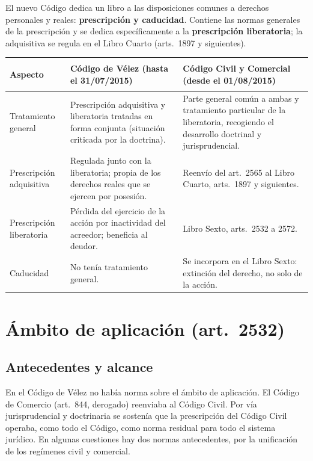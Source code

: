 \documentclass[12pt,oneside]{book}
\begin{document}
\begin{important}
El nuevo C\'odigo dedica un libro a las disposiciones comunes a derechos personales y reales: \textbf{prescripci\'on y caducidad}. Contiene las normas generales de la prescripci\'on y se dedica espec\'ificamente a la \textbf{prescripci\'on liberatoria}; la adquisitiva se regula en el Libro Cuarto (arts.\ 1897 y siguientes).
\end{important}

\begin{table}[H]
\centering\small
\begin{tabularx}{\textwidth}{>{\bfseries\raggedright\arraybackslash}p{2.9cm}>{\raggedright\arraybackslash}X>{\raggedright\arraybackslash}X}
\toprule
Aspecto & C\'odigo de V\'elez (hasta el 31/07/2015) & C\'odigo Civil y Comercial (desde el 01/08/2015) \\
\midrule
Tratamiento general & Prescripci\'on adquisitiva y liberatoria tratadas en forma conjunta (situaci\'on criticada por la doctrina). & Parte general com\'un a ambas y tratamiento particular de la liberatoria, recogiendo el desarrollo doctrinal y jurisprudencial. \\
Prescripci\'on adquisitiva & Regulada junto con la liberatoria; propia de los derechos reales que se ejercen por posesi\'on. & Reenv\'io del art.\ 2565 al Libro Cuarto, arts.\ 1897 y siguientes. \\
Prescripci\'on liberatoria & P\'erdida del ejercicio de la acci\'on por inactividad del acreedor; beneficia al deudor. & Libro Sexto, arts.\ 2532 a 2572. \\
Caducidad & No ten\'ia tratamiento general. & Se incorpora en el Libro Sexto: extinci\'on del derecho, no solo de la acci\'on. \\
\bottomrule
\end{tabularx}
\end{table}

\section{\'Ambito de aplicaci\'on (art.\ 2532)}

\subsection{Antecedentes y alcance}

En el C\'odigo de V\'elez no hab\'ia norma sobre el \'ambito de aplicaci\'on. El C\'odigo de Comercio (art.\ 844, derogado) reenviaba al C\'odigo Civil. Por v\'ia jurisprudencial y doctrinaria se sosten\'ia que la prescripci\'on del C\'odigo Civil operaba, como todo el C\'odigo, como norma residual para todo el sistema jur\'idico. En algunas cuestiones hay dos normas antecedentes, por la unificaci\'on de los reg\'imenes civil y comercial.
\end{document}
